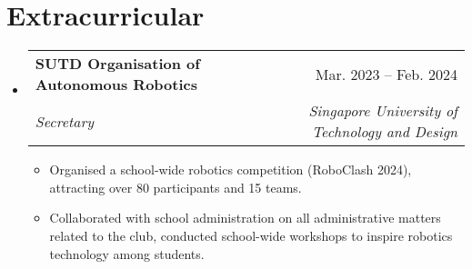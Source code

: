 \documentclass[letterpaper,11pt]{article}
\makeatletter
\newcommand{\resumeItem}[1]{
  \item\small{
    {#1 \vspace{-2pt}}
  }
}
\newcommand{\resumeSubheading}[4]{
  \vspace{-2pt}\item
    \begin{tabular*}{1.0\textwidth}[t]{l@{\extracolsep{\fill}}r}
      \textbf{#1} & \small #2 \\
      \textit{\small#3} & \textit{\small #4} \\
    \end{tabular*}\vspace{-7pt}
}
\newcommand{\resumeSubHeadingListStart}{\begin{itemize}[leftmargin=0.0in, label={}]}
\newcommand{\resumeSubHeadingListEnd}{\end{itemize}}
\newcommand{\resumeItemListStart}{\begin{itemize}}
\newcommand{\resumeItemListEnd}{\end{itemize}\vspace{-5pt}}
\makeatother
\begin{document}
\section{Extracurricular}
    \resumeSubHeadingListStart
        \resumeSubheading{SUTD Organisation of Autonomous Robotics}{Mar. 2023 -- Feb. 2024}{Secretary}{Singapore University of Technology and Design}
            \resumeItemListStart
                \resumeItem{Organised a school-wide robotics competition (RoboClash 2024), attracting over 80 participants and 15 teams.}
                \resumeItem{Collaborated with school administration on all administrative matters related to the club, conducted school-wide workshops to inspire robotics technology among students.}
            \resumeItemListEnd
    \resumeSubHeadingListEnd
\end{document}
